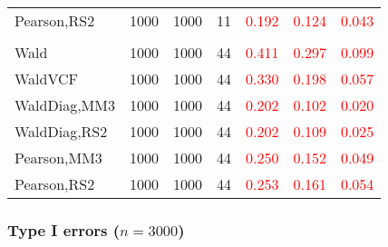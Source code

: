 \documentclass[
]{article}
\begin{document}
\begin{table}[H]
{\begin{tabular}[t]{lrrrrrr}
\hspace{1em}Pearson,RS2 & 1000 & 1000 & 11 & \textcolor{red}{0.192} & \textcolor{red}{0.124} & \textcolor{red}{0.043}\\
\addlinespace[0.3em]
\multicolumn{7}{l}{\textbf{3F 15V}}\\
\hspace{1em}Wald & 1000 & 1000 & 44 & \textcolor{red}{0.411} & \textcolor{red}{0.297} & \textcolor{red}{0.099}\\
\hspace{1em}WaldVCF & 1000 & 1000 & 44 & \textcolor{red}{0.330} & \textcolor{red}{0.198} & \textcolor{red}{0.057}\\
\hspace{1em}WaldDiag,MM3 & 1000 & 1000 & 44 & \textcolor{red}{0.202} & \textcolor{red}{0.102} & \textcolor{red}{0.020}\\
\hspace{1em}WaldDiag,RS2 & 1000 & 1000 & 44 & \textcolor{red}{0.202} & \textcolor{red}{0.109} & \textcolor{red}{0.025}\\
\hspace{1em}Pearson,MM3 & 1000 & 1000 & 44 & \textcolor{red}{0.250} & \textcolor{red}{0.152} & \textcolor{red}{0.049}\\
\hspace{1em}Pearson,RS2 & 1000 & 1000 & 44 & \textcolor{red}{0.253} & \textcolor{red}{0.161} & \textcolor{red}{0.054}\\
\bottomrule
\end{tabular}}
\endgroup{}
\end{table}

\hypertarget{type-i-errors-n3000-1}{%
\subsubsection{\texorpdfstring{Type I errors
(\(n=3000\))}{Type I errors (n=3000)}}\label{type-i-errors-n3000-1}}
\end{document}
